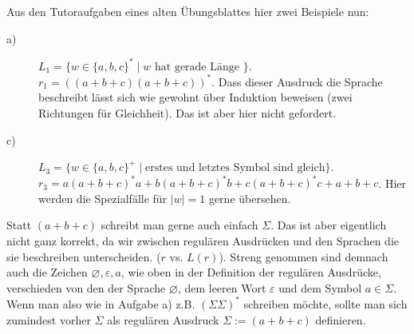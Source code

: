 \documentclass[11pt, a4paper]{article}
\let\emptyset\varnothing
\begin{document}
Aus den Tutoraufgaben eines alten Übungsblattes hier zwei Beispiele nun:
\begin{description}
	\item[a)] \( L_1 = \{ w \in \{ a, b, c \}^\ast \mid w \text{ hat gerade Länge } \} \).\\
		\( r_1 = ((a+b+c)(a+b+c))^\ast \). Dass dieser Ausdruck die Sprache beschreibt lässt sich wie gewohnt über Induktion beweisen (zwei Richtungen für Gleichheit). Das ist aber hier nicht gefordert.
	\item[c)] \( L_3 = \{ w \in \{ a, b, c \}^+ \mid \text{erstes und letztes Symbol sind gleich} \} \).\\
		\( r_3 = a(a+b+c)^\ast a + b(a+b+c)^\ast b + c(a+b+c)^\ast c + a + b + c \). Hier werden die Spezialfälle für \( \left| w \right| = 1 \) gerne übersehen.
\end{description}
Statt \( (a+b+c) \) schreibt man gerne auch einfach \( \Sigma \). Das ist aber eigentlich nicht ganz korrekt, da wir zwischen regulären Ausdrücken und den Sprachen die sie beschreiben unterscheiden. (\( r \) vs. \( L(r) \)). Streng genommen sind demnach auch die Zeichen \( \emptyset, \varepsilon, a \), wie oben in der Definition der regulären Ausdrücke, verschieden von den der Sprache \( \emptyset \), dem leeren Wort \( \varepsilon \) und dem Symbol \( a \in \Sigma \). Wenn man also wie in Aufgabe a) z.B. \( (\Sigma\Sigma)^\ast \) schreiben möchte, sollte man sich zumindest vorher \( \Sigma \) als regulären Ausdruck \( \Sigma := (a+b+c) \) definieren.
\end{document}
